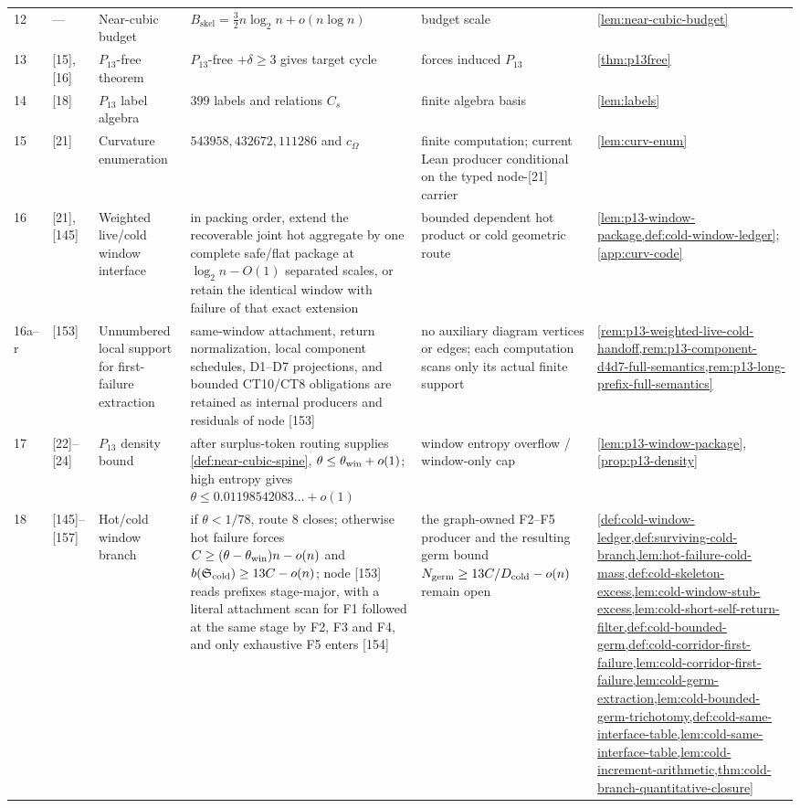\documentclass[11pt]{article}
\begin{document}
{\begin{longtable}{C{0.04\textwidth} L{0.13\textwidth} L{0.17\textwidth} L{0.25\textwidth} L{0.21\textwidth} L{0.12\textwidth}}
12 & --- & Near-cubic budget & $B_{\mathrm{skel}}=\frac32 n\log_2n+o(n\log n)$ & budget scale & \cref{lem:near-cubic-budget} \\
13 & [15], [16] & $P_{13}$-free theorem & $P_{13}$-free $+\delta\ge3$ gives target cycle & forces induced $P_{13}$ & \cref{thm:p13free} \\
14 & [18] & $P_{13}$ label algebra & $399$ labels and relations $C_s$ & finite algebra basis & \cref{lem:labels} \\
15 & [21] & Curvature enumeration & $543958,432672,111286$ and $c_\Omega$ & finite computation; current Lean producer conditional on the typed node-[21] carrier & \cref{lem:curv-enum} \\
16 & [21], [145] & Weighted live/cold window interface & in packing order, extend the recoverable joint hot aggregate by one complete safe/flat package at \(\log_2n-O(1)\) separated scales, or retain the identical window with failure of that exact extension & bounded dependent hot product or cold geometric route & \cref{lem:p13-window-package,def:cold-window-ledger}; \cref{app:curv-code} \\
16a--r & [153] & Unnumbered local support for first-failure extraction & same-window attachment, return normalization, local component schedules, D1--D7 projections, and bounded CT10/CT8 obligations are retained as internal producers and residuals of node [153] & no auxiliary diagram vertices or edges; each computation scans only its actual finite support & \cref{rem:p13-weighted-live-cold-handoff,rem:p13-component-d4d7-full-semantics,rem:p13-long-prefix-full-semantics} \\
17 & [22]--[24] & $P_{13}$ density bound & after surplus-token routing supplies \cref{def:near-cubic-spine}, $\theta\le\theta_{\rm win}+o(1)$; high entropy gives $\theta\le0.01198542083\ldots+o(1)$ & window entropy overflow / window-only cap & \cref{lem:p13-window-package}, \cref{prop:p13-density} \\
18 & [145]--[157] & Hot/cold window branch & if \(\theta<1/78\), route 8 closes; otherwise hot failure forces \(C\ge(\theta-\theta_{\rm win})n-o(n)\) and \(b(\mathfrak S_{\rm cold})\ge13C-o(n)\); node [153] reads prefixes stage-major, with a literal attachment scan for F1 followed at the same stage by F2, F3 and F4, and only exhaustive F5 enters [154] & the graph-owned F2--F5 producer and the resulting germ bound \(N_{\rm germ}\ge13C/D_{\rm cold}-o(n)\) remain open & \cref{def:cold-window-ledger,def:surviving-cold-branch,lem:hot-failure-cold-mass,def:cold-skeleton-excess,lem:cold-window-stub-excess,lem:cold-short-self-return-filter,def:cold-bounded-germ,def:cold-corridor-first-failure,lem:cold-corridor-first-failure,lem:cold-germ-extraction,lem:cold-bounded-germ-trichotomy,def:cold-same-interface-table,lem:cold-same-interface-table,lem:cold-increment-arithmetic,thm:cold-branch-quantitative-closure} \\

\end{longtable}}
\end{document}
